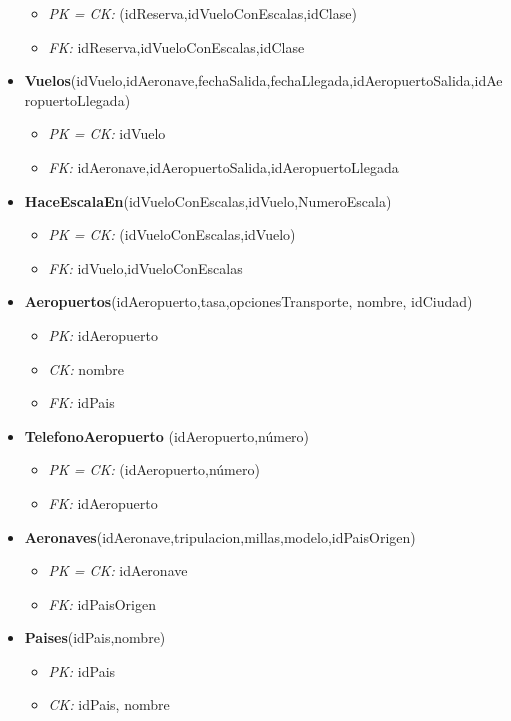 \begin{itemize}
		\begin{itemize}
			\item \textit{PK = CK: } (idReserva,idVueloConEscalas,idClase)
			\item \textit{FK: } idReserva,idVueloConEscalas,idClase
		\end{itemize}
	\item \textbf{Vuelos}(idVuelo,idAeronave,fechaSalida,fechaLlegada,idAeropuertoSalida,idAeropuertoLlegada)
		\begin{itemize}
			\item \textit{PK = CK:} idVuelo
			\item \textit{FK: } idAeronave,idAeropuertoSalida,idAeropuertoLlegada
		\end{itemize}
	\item \textbf{HaceEscalaEn}(idVueloConEscalas,idVuelo,NumeroEscala)
		\begin{itemize}
			\item \textit{PK = CK:} (idVueloConEscalas,idVuelo)
			\item \textit{FK: } idVuelo,idVueloConEscalas
		\end{itemize}
	\item \textbf{Aeropuertos}(idAeropuerto,tasa,opcionesTransporte, nombre, idCiudad)
		\begin{itemize}
			\item \textit{PK: } idAeropuerto
			\item \textit{CK: } nombre
			\item \textit{FK: } idPais
		\end{itemize}
	\item \textbf{TelefonoAeropuerto}	(idAeropuerto,número)
		\begin{itemize}
			\item \textit{PK = CK: } (idAeropuerto,número)
			\item \textit{FK: } idAeropuerto
		\end{itemize}
	\item \textbf{Aeronaves}(idAeronave,tripulacion,millas,modelo,idPaisOrigen)
		\begin{itemize}
			\item \textit{PK = CK: } idAeronave
			\item \textit{FK: } idPaisOrigen
		\end{itemize}
	\item \textbf{Paises}(idPais,nombre)
		\begin{itemize}
			\item \textit{PK: } idPais
			\item \textit{CK: } idPais, nombre

\end{itemize}
\end{itemize}
